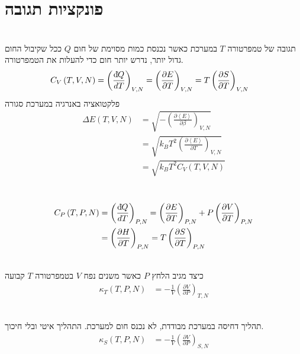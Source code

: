 \section{פונקציות תגובה}
\begin{cheatformula}\\
תגובה של טמפרטורה $T$ במערכת כאשר נכנסת כמות מסוימת של חום $Q$
ככל שקיבול החום גדול יותר, נדרש יותר חום כדי להעלות את הטמפרטורה.
    \begin{align*}
        C_V\left(T,V,N\right) &= \left( \frac{\mathrm{d}\hspace*{-0.1405em}\bar{}\hspace*{0.1em} Q}{dT} \right)_{V,N} = \left( \frac{\partial E}{\partial T} \right)_{V,N} = T \left( \frac{\partial S}{\partial T} \right)_{V,N} 
    \end{align*}
פלקטואציה באנרגיה במערכת סגורה
\begin{align*}
    \Delta E\left( T,V,N \right) &= \sqrt{-\left( \frac{\partial \left< E \right>}{\partial \beta }\right)_{V,N}} \\
    &= \sqrt{k_B T^2 \left( \frac{\partial \left< E \right>}{\partial T }\right)_{V,N}} \\
    &= \sqrt{k_B T^2 C_V\left(T,V,N\right)} 
\end{align*}
\end{cheatformula}

\begin{cheatformula}\\
    \begin{align*}
        C_P\left(T,P,N\right) &= \left( \frac{\mathrm{d}\hspace*{-0.1405em}\bar{}\hspace*{0.1em} Q}{dT} \right)_{P,N} = \left( \frac{\partial E}{\partial T} \right)_{P,N} 
        + P \left( \frac{\partial V}{\partial T} \right)_{P,N} \\
        &= \left( \frac{\partial H}{\partial T} \right)_{P,N} = T \left( \frac{\partial S}{\partial T} \right)_{P,N} 
    \end{align*}
\end{cheatformula}


\begin{cheatformula}\\
כיצד מגיב הלחץ $P$ כאשר משנים נפח $V$ בטמפרטורה $T$ קבועה
    \begin{align*}
        \kappa_T\left(T,P,N\right) &= - \frac{1}{V} \left( \frac{\partial V}{\partial P} \right)_{T,N}
    \end{align*}
\end{cheatformula}


\begin{cheatformula}\\
תהליך דחיסה במערכת מבודדת, לא נכנס חום למערכת. התהליך איטי ובלי חיכוך.
    \begin{align*}
        \kappa_S\left(T,P,N\right) &= - \frac{1}{V} \left( \frac{\partial V}{\partial P} \right)_{S,N}
    \end{align*}
\end{cheatformula}



